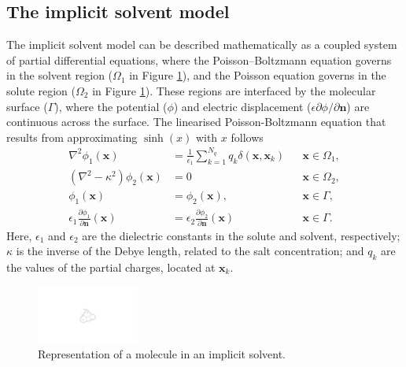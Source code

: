 \subsection*{\sffamily \large The implicit solvent model}

The implicit solvent model\cite{RouxSimonson1999, DecherchiETal2015} can be described mathematically as a coupled system of partial differential equations, where the Poisson--Boltzmann equation governs in the solvent region ($\Omega_1$ in Figure \ref{fig:implicit_molecule}), and the Poisson equation governs in the solute region ($\Omega_2$ in Figure \ref{fig:implicit_molecule}). These regions are interfaced by the molecular surface ($\Gamma$), where the potential ($\phi$) and electric displacement ($\epsilon\partial\phi/\partial\mathbf{n}$) are continuous across the surface. The linearised Poisson-Boltzmann equation that results from approximating $\sinh(x)$ with $x$ follows
%
\begin{subequations}
\label{eq:pbe}
\begin{align}
\nabla^2\phi_1(\mathbf{x}) &= \tfrac{1}{\epsilon_1}\sum_{k=1}^{N_q} q_k\delta(\mathbf{x},\mathbf{x}_k)&&\mathbf{x} \in \Omega_1,\label{eq:pbe1}\\
\left(\nabla^2 - \kappa^2\right)\phi_2(\mathbf{x})  &= 0&&\mathbf{x}\in\Omega_2,\label{eq:pbe2}\\
\phi_1(\mathbf{x})  &= \phi_2 (\mathbf{x}),&&\mathbf{x}\in \Gamma,\label{eq:pbe3}\\
\epsilon_1\frac{\partial\phi_1}{\partial\mathbf{n}}(\mathbf{x}) &= \epsilon_2\frac{\partial\phi_2}{\partial\mathbf{n}}(\mathbf{x})&&\mathbf{x}\in \Gamma. \label{eq:pbe4}
\end{align}
\end{subequations}
%
Here, $\epsilon_1$ and $\epsilon_2$ are the dielectric constants in the solute and solvent, respectively; $\kappa$ is the inverse of the Debye length, related to the salt concentration; and $q_k$ are the values of the partial charges, located at $\mathbf{x}_k$.

\begin{figure}
\centering
\includegraphics[width=0.3\textwidth]{implicit_molecule.pdf}
\caption{Representation of a molecule in an implicit solvent.}
\label{fig:implicit_molecule}
\end{figure}

